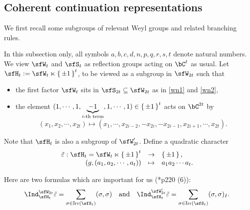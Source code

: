 \documentclass[12pt,a4paper]{amsart}
\def\subset{\subseteq}
\numberwithin{equation}{section}
\theoremstyle{remark}
\def\Irr{\mathrm{Irr}}
\def\AND{\quad \text{and} \quad}
\begin{document}
\subsection{Coherent continuation representations}\label{subsec:explicitCoh}



We first recall some subgroups of relevant Weyl groups and related branching rules.


In this subsection only, all symbols $a,b,c,d,n,p,q,r,s,t$ denote natural numbers. We view $\sfW_{t}$ and
$\sfS_{t}$ as reflection groups acting on $\bC^{t}$ as usual. Let
$\sfH_{t} := \sfW_t\ltimes \set{\pm 1}^t$, to be viewed as a  subgroup in $\sfW_{2t}$ such
that
\begin{itemize}
  \item the first factor $\sfW_{t}$ sits in $\sfS_{2t}\subset \sfW_{2t}$ as in \eqref{wn1} and \eqref{wn2},  
    \item the element $(1,\cdots,1, \underbrace{-1}_{i\text{-th
        term}}, 1, \cdots, 1)\in \set{\pm 1}^{t}$ acts on $\bC^{2t}$ by
        \[
        (x_{1},x_{2},\cdots, x_{2t} ) \mapsto (x_{1},\cdots, x_{2i-2}, -x_{2i},-x_{2i-1},x_{2i+1},\cdots, x_{2t}).
        \]
\end{itemize}
Note that $\sfH_{t}$ is also a subgroup of $\sfW'_{2t}$. Define a quadratic
character
\[
  \begin{array}{rcl}
    \tilde{\varepsilon} :  \sfH_{t}=  \sfW_{t}\ltimes \set{\pm 1}^{t}& \rightarrow & \set{\pm 1},\\
                                  (g,(a_{1},a_{2},\cdots, a_{t})) & \mapsto & a_{1}a_{2}\cdots a_{t}.
  \end{array}
\]

Here are two formulas which are important for us (\cite{Mc}*{p220 (6)}):
\begin{equation}\label{eq:CC.C}
  \Ind_{\sfH_{t}}^{\sfW_{2t}}\tilde{\varepsilon} = \sum_{\sigma\in \Irr(\sfS_{t})} (\sigma,\sigma)
  \AND
  \Ind_{\sfH_{t}}^{\sfW'_{2t}} \tilde{\varepsilon} = \sum_{\sigma\in \Irr(\sfS_{t})} (\sigma,\sigma)_{I}.
\end{equation}


\end{document}
